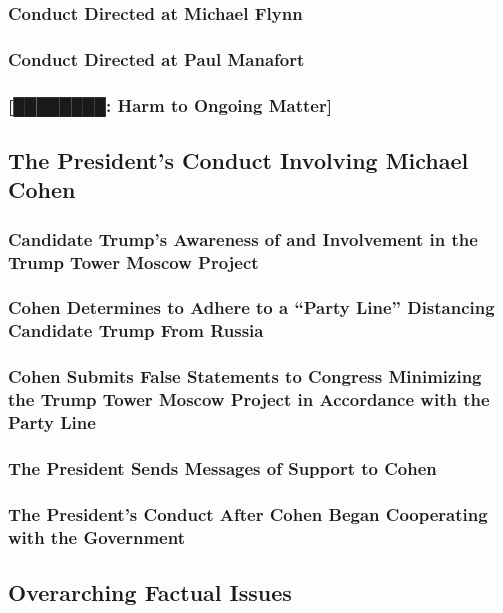 \subsubsection{Conduct Directed at Michael Flynn}

\subsubsection{Conduct Directed at Paul Manafort}

\subsubsection{[████████: Harm to Ongoing Matter]}

\subsection{The President’s Conduct Involving Michael Cohen}

\subsubsection{Candidate Trump’s Awareness of and Involvement in the Trump Tower Moscow Project}

\subsubsection{Cohen Determines to Adhere to a “Party Line” Distancing Candidate Trump From Russia}

\subsubsection{Cohen Submits False Statements to Congress Minimizing the Trump Tower Moscow Project in Accordance with the Party Line}

\subsubsection{The President Sends Messages of Support to Cohen}

\subsubsection{The President’s Conduct After Cohen Began Cooperating with the Government}

\subsection{Overarching Factual Issues}
